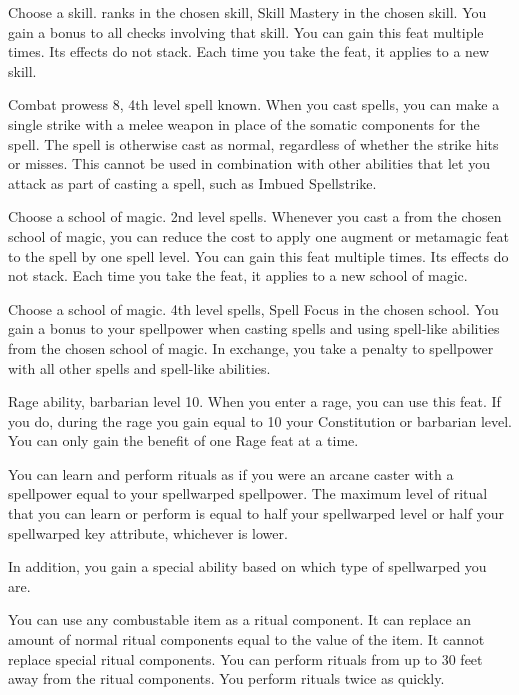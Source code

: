 Choose a skill.
 ranks in the chosen skill, Skill Mastery in the chosen skill.
\featben You gain a  bonus to all checks involving that skill.
You can gain this feat multiple times.
Its effects do not stack.
Each time you take the feat, it applies to a new skill.

\featpre Combat prowess 8, 4th level spell known.
\featben When you cast spells, you can make a single strike with a melee weapon in place of the somatic components for the spell.
The spell is otherwise cast as normal, regardless of whether the strike hits or misses.
This cannot be used in combination with other abilities that let you attack as part of casting a spell, such as Imbued Spellstrike.

Choose a school of magic.
\featpre 2nd level spells.
\featben Whenever you cast a from the chosen school of magic, you can reduce the cost to apply one augment or metamagic feat to the spell by one spell level.
You can gain this feat multiple times.
Its effects do not stack.
Each time you take the feat, it applies to a new school of magic.

Choose a school of magic.
\featpres 4th level spells, Spell Focus in the chosen school.
\featben You gain a  bonus to your spellpower when casting spells and using spell-like abilities from the chosen school of magic.
In exchange, you take a  penalty to spellpower with all other spells and spell-like abilities.

\featpre Rage ability, barbarian level 10.
\featben When you enter a rage, you can use this feat. If you do, during the rage you gain  equal to 10 \add your Constitution or barbarian level.
 You can only gain the benefit of one Rage feat at a time.

\featben You can learn and perform rituals as if you were an arcane caster with a spellpower equal to your spellwarped spellpower.
The maximum level of ritual that you can learn or perform is equal to half your spellwarped level or half your spellwarped key attribute, whichever is lower.

In addition, you gain a special ability based on which type of spellwarped you are.

 \x
{}
You can use any combustable item as a ritual component.
It can replace an amount of normal ritual components equal to the value of the item.
It cannot replace special ritual components.
You can perform rituals from up to 30 feet away from the ritual components.
You perform rituals twice as quickly.

